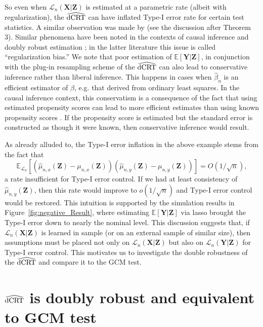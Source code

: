 \documentclass[12pt]{article}
\theoremstyle{definition}
\theoremstyle{remark}
\newcommand{\E}{\mathbb E}								%
\newcommand{\prx}{\bm X}								%
\newcommand{\prz}{\bm Z}								%
\newcommand{\pry}{{\bm Y}}								%
\newcommand{\law}{\mathcal L}							%
\newcommand{\dCRThat}{\widehat{\textnormal{dCRT}}}		%
\begin{document}
	So even when $\law_n(\prx|\prz)$ is estimated at a parametric rate (albeit with regularization),  the $\dCRThat$ can have inflated Type-I error rate for certain test statistics. A similar observation was made by \citet{Li2022} (see the discussion after Theorem 3). Similar phenomena have been noted in the contexts of causal inference \citep{Dukes2020a} and doubly robust estimation \citep{Chernozhukov2018, Chernozhukov2022}; in the latter literature this issue is called ``regularization bias.'' We note that poor estimation of $\E[\pry|\prz]$, in conjunction with the plug-in resampling scheme of the $\dCRThat$ can also lead to conservative inference rather than liberal inference. This happens in cases when $\widehat \beta_n$ is an efficient estimator of $\beta$, e.g. that derived from ordinary least squares. In the causal inference context, this conservatism is a consequence of the fact that using estimated propensity scores can lead to more efficient estimates than using known propensity scores \citep{Robins1992, Henmi2004}. If the propensity score is estimated but the standard error is constructed as though it were known, then conservative inference would result. 
		
	As already alluded to, the Type-I error inflation in the above example stems from the fact that
	\begin{equation*}
	\E_{\law_n}[(\widehat \mu_{n,x}(\prz) - \mu_{n,x}(\prz))(\widehat \mu_{n,y}(\prz) - \mu_{n,y}(\prz))] = O(1/\sqrt{n}), 
	\end{equation*}
	a rate insufficient for Type-I error control. If we had at least consistency of $\widehat \mu_{n,y}(\prz)$, then this rate would improve to $o(1/\sqrt{n})$ and Type-I error control would be restored. This intuition is supported by the simulation results in Figure~\ref{fig:negative_Result}, where estimating $\E[\pry|\prz]$ via lasso brought the Type-I error down to nearly the nominal level. This discussion suggests that, if $\law_n(\prx|\prz)$ is learned in sample (or on an external sample of similar size), then assumptions must be placed not only on $\law_n(\prx|\prz)$ but also on $\law_n(\pry|\prz)$ for Type-I error control. This motivates us to investigate the double robustness of the $\dCRThat$ and compare it to the GCM test.
	
	
	\section{$\dCRThat$ is doubly robust and equivalent to GCM test} \label{sec:dr-and-equivalence}
	
\end{document}

